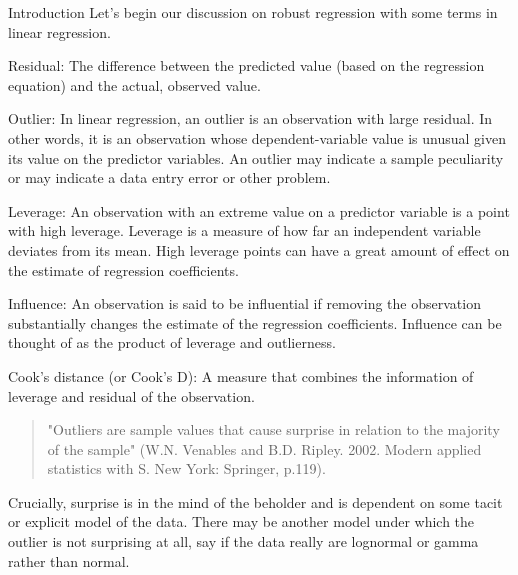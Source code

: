 Introduction
Let's begin our discussion on robust regression with some terms in linear regression.

Residual: The difference between the predicted value (based on the regression equation) and the actual, observed value.

Outlier: In linear regression, an outlier is an observation with large residual. In other words, it is an observation whose dependent-variable value is unusual given its value on the predictor variables. An outlier may indicate a sample peculiarity or may indicate a data entry error or other problem.

Leverage: An observation with an extreme value on a predictor variable is a point with high leverage. Leverage is a measure of how far an independent variable deviates from its mean. High leverage points can have a great amount of effect on the estimate of regression coefficients.

Influence: An observation is said to be influential if removing the observation substantially changes the estimate of the regression coefficients.  Influence can be thought of as the product of leverage and outlierness.

Cook's distance (or Cook's D): A measure that combines the information of leverage and residual of the observation.




\begin{quote}
"Outliers are sample values that cause surprise in relation to the majority of the sample" (W.N. Venables and B.D. Ripley. 2002. Modern applied statistics with S. New York: Springer, p.119).
\end{quote}

Crucially, surprise is in the mind of the beholder and is dependent on some tacit or explicit model of the data. There may be another model under which the outlier is not surprising at all, say if the data really are lognormal or gamma rather than normal.


